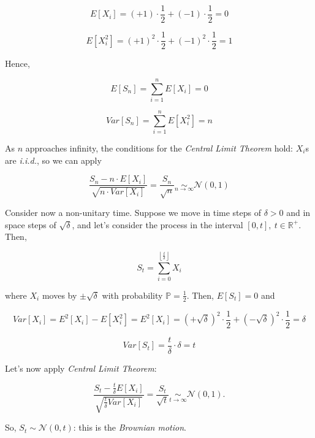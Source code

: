 \documentclass[oneside,titlepage,headinclude,12pt,a4paper,BCOR5mm,footinclude]{book}
\theoremstyle{defn}
\begin{document}
  \[
    E\left[X_i\right] = (+1) \cdot \frac{1}{2} + (-1) \cdot \frac{1}{2} = 0
  \]
    
  \[
    E\left[X_i^2\right] = (+1)^2 \cdot \frac{1}{2} + (-1)^2 \cdot \frac{1}{2} = 1
  \]

  Hence,

  \[
    E\left[S_n\right] = \sum_{i=1}^n E\left[X_i\right] = 0
  \]

  \[
    Var\left[S_n\right] = \sum_{i=1}^n E\left[X_i^2\right] = n
  \]

  As \(n\)  approaches infinity,  the conditions  for the  \textit{Central Limit
  Theorem} hold: \(X_i\)s are \textit{i.i.d.}, so we can apply

  \[
    \frac{S_n - n \cdot E\left[X_i\right]}{\sqrt{n \cdot Var\left[X_i\right]}}
    = \frac{S_n}{\sqrt{n}} \underset{n \to \infty}{\sim} \mathcal{N}(0,1)
  \]

  Consider now a non-unitary  time. Suppose we move in time  steps of \(\delta >
  0\) and in space steps of \(\sqrt{\delta}\), and let's consider the process in
  the interval $[0,t],\ t\in\mathbb{R}^+$. Then,

  \[
    S_t = \sum_{i=0}^{\left\lfloor \frac{t}{\delta} \right\rfloor} X_i
  \]

  where     $X_i$     moves     by     $\pm\sqrt\delta$     with     probability
  $\mathbb{P}=\frac{1}{2}$. Then, $E\left[S_t\right]=0$ and

  \[
    Var[X_i] = E^2[X_i] - E[X_i^2] = E^2[X_i] = (+\sqrt{\delta})^2 \cdot \frac{1}{2} + (-\sqrt{\delta})^2 \cdot \frac{1}{2} 
      = \delta
  \]

  \[
    Var[S_t] = \frac{t}{\delta} \cdot \delta = t
  \]

  Let's now apply \textit{Central Limit Theorem}:

  \[
    \frac{S_t - \frac{t}{\delta} E[X_i]}{\sqrt{\frac{t}{\delta} Var[X_i]}}
    = \frac{S_t}{\sqrt{t}} \underset{t \to \infty}{\sim} \mathcal{N}(0,1).
  \]

  So, $S_t \sim \mathcal{N}(0,t)$: this is the \textit{Brownian motion}.
\end{document}
